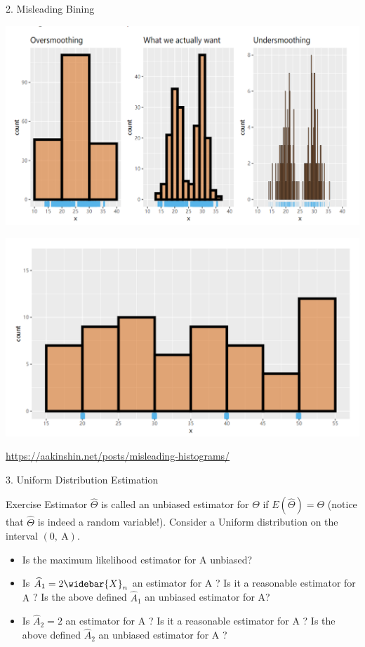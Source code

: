 \documentclass{beamer}
\begin{document}
\begin{frame}{2. Misleading Bining}
\begin{center}
\includegraphics[scale=0.25]{mis1.png}

\includegraphics[scale=0.25]{mis2.png}
\end{center}
\tiny{\url{https://aakinshin.net/posts/misleading-histograms/}}
\end{frame}

\begin{frame}{3. Uniform Distribution Estimation}
\begin{block}{Exercise}
Estimator $\widehat{\Theta}$ is called an unbiased estimator for $\Theta$ if $E(\widehat{\Theta})=\Theta$ (notice that $\widehat{\Theta}$ is indeed a random variable!).
Consider a Uniform distribution on the interval $(0, \mathrm{~A})$.
\begin{itemize}
\item Is the maximum likelihood estimator for A unbiased?
\item Is $\widehat{A}_{1}=2 \widebar{X}_{n}$ an estimator for $\mathrm{A}$ ? Is it a reasonable estimator for $\mathrm{A}$ ? Is the above defined $\widehat{A}_{1}$ an unbiased estimator for A?
\item Is $\widehat{A}_{2}=2$ an estimator for $\mathrm{A}$ ? Is it a reasonable estimator for $\mathrm{A}$ ? Is the above defined $\widehat{A}_{2}$ an unbiased estimator for $\mathrm{A}$ ?
\end{itemize}
\end{block}

\end{frame}
\end{document}
